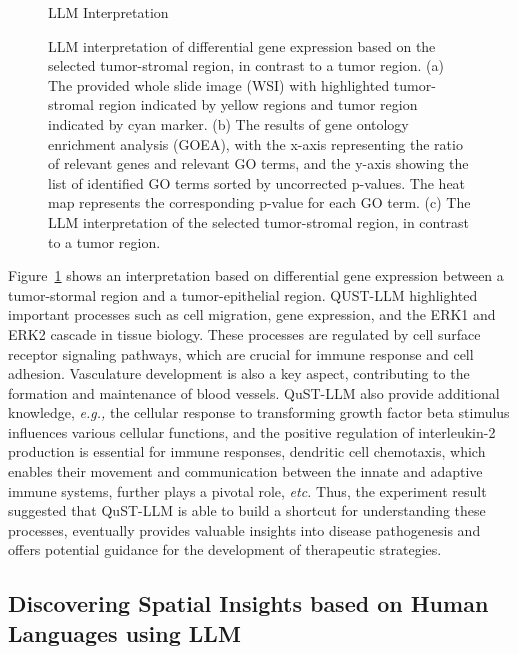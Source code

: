 \documentclass{article}
\begin{document}
\begin{figure}[t]
{\begin{llm}{LLM Interpretation}
	\end{llm}}%
	\caption{LLM interpretation of differential gene expression based on the selected tumor-stromal region, in contrast to a tumor region. (a) The provided whole slide image (WSI) with highlighted tumor-stromal region indicated by yellow regions and  tumor region  indicated by cyan marker. (b) The results of gene ontology enrichment analysis (GOEA), with the x-axis representing the ratio of relevant genes and relevant GO terms, and the y-axis showing the list of identified GO terms sorted by uncorrected p-values. The heat map represents the corresponding p-value for each GO term. (c) The LLM interpretation of the selected tumor-stromal region, in contrast to a tumor region.}%
	\label{fig:result3}%
\end{figure}%

Figure~\ref{fig:result3} shows an interpretation based on differential gene expression between a tumor-stormal region and a tumor-epithelial region. QUST-LLM highlighted important processes such as cell migration, gene expression, and the ERK1 and ERK2 cascade in tissue biology. These processes are regulated by cell surface receptor signaling pathways, which are crucial for immune response and cell adhesion. Vasculature development is also a key aspect, contributing to the formation and maintenance of blood vessels. QuST-LLM also provide additional knowledge, \textit{e.g.,} the cellular response to transforming growth factor beta stimulus influences various cellular functions, and the positive regulation of interleukin-2 production is essential for immune responses, dendritic cell chemotaxis, which enables their movement and communication between the innate and adaptive immune systems, further plays a pivotal role, \textit{etc.} Thus, the experiment result suggested that QuST-LLM is able to build a shortcut for understanding these processes, eventually  provides valuable insights into disease pathogenesis and offers potential guidance for the development of therapeutic strategies.

\subsection{Discovering Spatial Insights based on Human Languages using LLM}
\label{sec:llm4ci}
\end{document}
